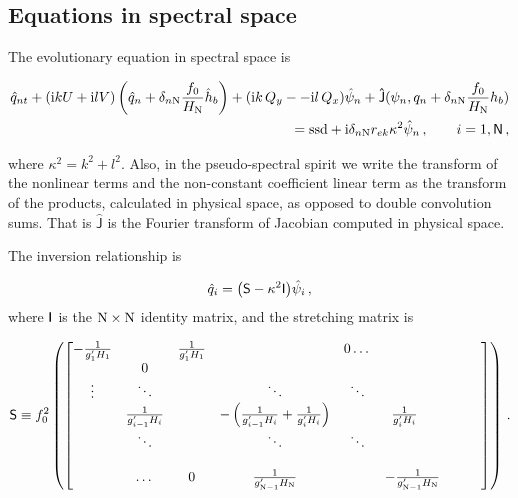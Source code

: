 \documentclass[11pt]{article}
\newcommand{\ssd}{\text{ssd}}
\newcommand{\sS}{\mathsf{S}}
\begin{document}
\subsection*{Equations in spectral space}

The evolutionary equation in spectral space is

\begin{align}
    \hat{q}_{nt} + (\mathrm{i} k U + \mathrm{i} l V) \left(\hat{q}_n + \delta_{n \nmax} \frac{f_0}{H_\nmax}\hat{h}_b\right) + (\mathrm{i} k\, {Q_y} -  - \mathrm{i} l\,{Q_x}){\hat{\psi}_n} + \mathsf{\hat{J}}(\psi_n, q_n + \delta_{n \nmax} \frac{f_0}{H_\nmax}h_b )   \nonumber \\ =  \ssd + \mathrm{i}  \delta_{n \nmax} r_{ek} \kappa^2 \hat{\psi}_n \,, \qquad i = 1,\textsf{N}\com
\end{align}

where $\kappa^2 = k^2 + l^2$. Also, in the pseudo-spectral spirit we write the transform of the nonlinear
terms and the non-constant coefficient linear term as the transform of the products, calculated in physical space, as opposed to double convolution sums.  That is $\mathsf{\hat{J}}$ is the Fourier transform of Jacobian computed in physical space.

The inversion relationship is

\begin{equation}
    \hat{q}_i = {\left(\sS - \kappa^2 \sI \right)} \hat{\psi}_i\com
\end{equation}
where $\mathsf{I}$ is the $\mathrm{N}\times\mathrm{N}$ identity matrix, and the stretching matrix is

\begin{equation}
\textsf{S} \equiv  f_0^2
\left(
\begin{bmatrix}
    -\frac{1}{g'_1 H_1}& & \frac{1}{g'_1 H_1} &  & 0 \dots& \\
 & 0 & & & & &\\
    \vdots & \ddots& &\ddots &\ddots & & & &\\
       & \frac{1}{g'_{i-1} H_i}& &  -\left(\frac{1}{g'_{i-1} H_i} + \frac{1}{g'_{i} H_i}\right)& & \frac{1}{g'_{i} H_i}\,\,\,\,\,\,\, \\
       & \ddots& & \ddots &\ddots & & & &\\
& & & & & \\
& \dots & 0 & \frac{1}{ g'_{\mathrm{N}-1} H_{\mathrm{N}}}& & -\frac{1}{g'_{\mathrm{N}-1} H_{\mathrm{N}}}
\end{bmatrix}
\right)
\, .
\end{equation}
\end{document}
